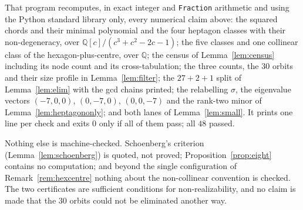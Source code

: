 \documentclass[11pt]{amsart}
\numberwithin{theorem}{section}
\theoremstyle{remark}
\theoremstyle{definition}
\begin{document}
That program recomputes, in exact integer and \texttt{Fraction} arithmetic and
using the Python standard library only, every numerical claim above: the squared
chords and their minimal polynomial and the four heptagon classes with their
non-degeneracy, over $\mathbb Q[c]/(c^3+c^2-2c-1)$; the five classes and one
collinear class of the hexagon-plus-centre, over $\mathbb Q$; the census of
Lemma~\ref{lem:census} including its node count and its cross-tabulation; the
three counts, the $30$ orbits and their size profile in
Lemma~\ref{lem:filter}; the $27+2+1$ split of Lemma~\ref{lem:elim} with the gcd
chains printed; the relabelling $\sigma$, the eigenvalue vectors $(-7,0,0)$,
$(0,-7,0)$, $(0,0,-7)$ and the rank-two minor of
Lemma~\ref{lem:heptagononly}; and both lanes of Lemma~\ref{lem:small}. It prints
one line per check and exits $0$ only if all of them pass; all $48$ passed.

Nothing else is machine-checked. Schoenberg's criterion (Lemma~\ref{lem:schoenberg}) is
quoted, not proved; Proposition~\ref{prop:eight} contains no computation; and
beyond the single configuration of Remark~\ref{rem:hexcentre} nothing about the
non-collinear convention is checked. The two certificates are sufficient
conditions for non-realizability, and no claim is made that the $30$ orbits
could not be eliminated another way.
\end{document}
